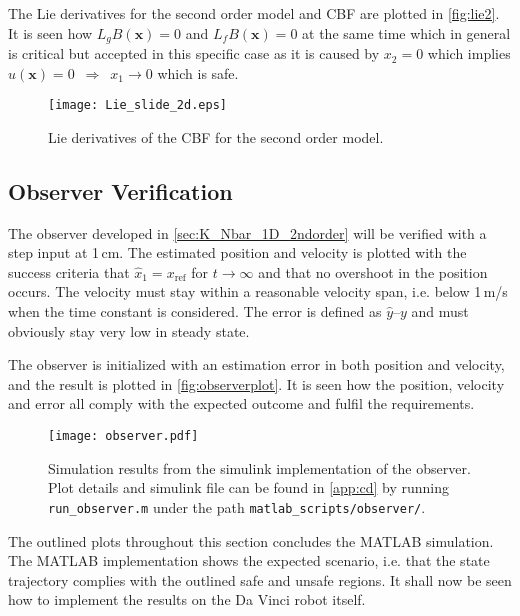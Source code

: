 The Lie derivatives for the second order model and CBF are plotted in \autoref{fig:lie2}.
It is seen how $L_gB(\mathbf{x}) = 0$ and $L_fB(\mathbf{x}) = 0$ at the same time which in general is critical but accepted in this specific case as it is caused by $x_2=0$ which implies $u(\mathbf{x})=0 \,\,\, \Rightarrow \,\,\, x_1 \rightarrow 0$ which is safe.
\begin{figure}[H]
\hspace{-7mm}
		\texttt{[image: Lie\_slide\_2d.eps]}
	\caption{Lie derivatives of the CBF for the second order model. }
	\label{fig:lie2}
\end{figure}
\subsection{Observer Verification}
\vspace{-2mm}
The observer developed in \autoref{sec:K_Nbar_1D_2ndorder} will be verified with a step input at 1\,cm. The estimated position and velocity is plotted with the success criteria that $\hat{x}_1 = x_\text{ref}$ for $t \rightarrow \infty$ and that no overshoot in the position occurs. The velocity must stay within a reasonable velocity span, i.e. below 1\,m/s when the time constant is considered. The error is defined as $\hat{y}$--$y$ and must obviously stay very low in steady state.

The  observer is initialized with an estimation error in both position and velocity, and the result is plotted in \autoref{fig:observerplot}. It is seen how the position, velocity and error all comply with the expected outcome and fulfil the requirements.
\begin{figure}[H]
\hspace{-7mm}
		\texttt{[image: observer.pdf]}
	\caption{Simulation results from the simulink implementation of the observer. Plot details and simulink file can be found in \autoref{app:cd} by running \texttt{run\_observer.m} under the path \texttt{matlab\_scripts/observer/}.}
	\label{fig:observerplot}
\end{figure}
The outlined plots throughout this section concludes the MATLAB simulation. The MATLAB implementation shows the expected scenario, i.e. that the state trajectory complies with the outlined safe and unsafe regions. It shall now be seen how to implement the results on the Da Vinci robot itself.

